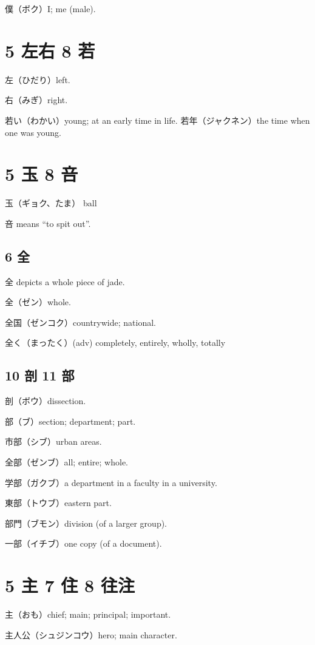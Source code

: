 僕（ボク）I; me (male).

\section{5 左右 8 若}

左（ひだり）left.

右（みぎ）right.

若い（わかい）young; at an early time in life.
若年（ジャクネン）the time when one was young.

\section{5 玉 8 咅}

玉（ギョク、たま） ball

咅 means ``to spit out''.

\subsection{6 全}

全 depicts a whole piece of jade.

全（ゼン）whole.

全国（ゼンコク）countrywide; national.

全く（まったく）(adv) completely, entirely, wholly, totally

\subsection{10 剖 11 部}

剖（ボウ）dissection.

部（ブ）section; department; part.

市部（シブ）urban areas.

全部（ゼンブ）all; entire; whole.

学部（ガクブ）a department in a faculty in a university.

東部（トウブ）eastern part.

部門（ブモン）division (of a larger group).

一部（イチブ）one copy (of a document).

\section{5 主 7 住 8 往注}

主（おも）chief; main; principal; important.

主人公（シュジンコウ）hero; main character.

